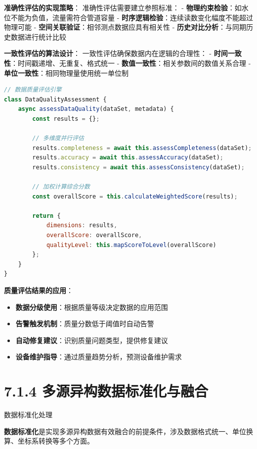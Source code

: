 \textbf{准确性评估的实现策略}： 准确性评估需要建立参照标准： - \textbf{物理约束检验}：如水位不能为负值，流量需符合管道容量 - \textbf{时序逻辑检验}：连续读数变化幅度不能超过物理可能 - \textbf{空间关联验证}：相邻测点数据应具有相关性 - \textbf{历史对比分析}：与同期历史数据进行统计比较

\textbf{一致性评估的算法设计}： 一致性评估确保数据内在逻辑的合理性： - \textbf{时间一致性}：时间戳递增、无重复、格式统一 - \textbf{数值一致性}：相关参数间的数值关系合理 - \textbf{单位一致性}：相同物理量使用统一单位制

\begin{lstlisting}[language=Javascript]
// 数据质量评估引擎
class DataQualityAssessment {
    async assessDataQuality(dataSet, metadata) {
        const results = {};
        
        // 多维度并行评估
        results.completeness = await this.assessCompleteness(dataSet);
        results.accuracy = await this.assessAccuracy(dataSet);
        results.consistency = await this.assessConsistency(dataSet);
        
        // 加权计算综合分数
        const overallScore = this.calculateWeightedScore(results);
        
        return {
            dimensions: results,
            overallScore: overallScore,
            qualityLevel: this.mapScoreToLevel(overallScore)
        };
    }
}
\end{lstlisting}

\textbf{质量评估结果的应用}：

\begin{itemize}
\tightlist
\item
  \textbf{数据分级使用}：根据质量等级决定数据的应用范围
\item
  \textbf{告警触发机制}：质量分数低于阈值时自动告警
\item
  \textbf{自动修复建议}：识别质量问题类型，提供修复建议
\item
  \textbf{设备维护指导}：通过质量趋势分析，预测设备维护需求
\end{itemize}

\section{7.1.4 多源异构数据标准化与融合}

 数据标准化处理

\textbf{数据标准化}是实现多源异构数据有效融合的前提条件，涉及数据格式统一、单位换算、坐标系转换等多个方面。

